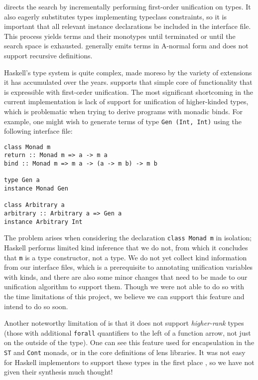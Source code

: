 \Rulecheck directs the search by incrementally performing first-order unification on types. It also eagerly substitutes types implementing typeclass constraints, so it is important that all relevant instance declarations be included in the interface file. This process yields terms and their monotypes until terminated or until the search space is exhausted. \Rulecheck generally emits terms in A-normal form and does not support recursive definitions.

Haskell's type system is quite complex, made moreso by the variety of extensions it has accumulated over the years. \Rulecheck supports that simple core of functionality that is expressible with first-order unification. The most significant shortcoming in the current implementation is lack of support for unification of higher-kinded types, which is problematic when trying to derive programs with monadic binds. For example, one might wish to generate terms of type \texttt{Gen (Int, Int)} using the following interface file:

{
\smallskip
\begin{verbatim}
class Monad m
return :: Monad m => a -> m a
bind :: Monad m => m a -> (a -> m b) -> m b

type Gen a
instance Monad Gen

class Arbitrary a
arbitrary :: Arbitrary a => Gen a
instance Arbitrary Int
\end{verbatim}
\smallskip
}

The problem arises when considering the declaration \texttt{class Monad m} in isolation; Haskell performs limited kind inference that we do not, from which it concludes that \texttt{m} is a type constructor, not a type. We do not yet collect kind information from our interface files, which is a prerequisite to annotating unification variables with kinds, and there are also some minor changes that need to be made to our unification algorithm to support them. Though we were not able to do so with the time limitations of this project, we believe we can support this feature and intend to do so soon.

Another noteworthy limitation of \Rulecheck is that it does not support \textit{higher-rank} types (those with additional \texttt{forall} quantifiers to the left of a function arrow, not just on the outside of the type). One can see this feature used for encapsulation in the \texttt{ST} and \texttt{Cont} monads, or in the core definitions of lens libraries. It was not easy for Haskell implementors to support these types in the first place \cite{jones2007practical}, so we have not given their synthesis much thought!
